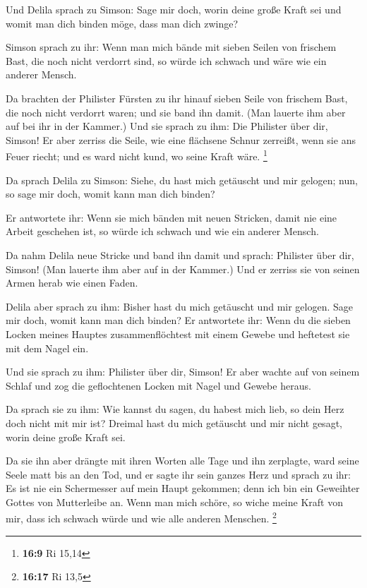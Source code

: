  Und Delila sprach zu Simson: Sage mir doch, worin deine
große Kraft sei und womit man dich binden möge, dass man dich zwinge?

 Simson sprach zu ihr: Wenn man mich bände mit sieben
Seilen von frischem Bast, die noch nicht verdorrt sind, so würde ich
schwach und wäre wie ein anderer Mensch.

 Da brachten der Philister Fürsten zu ihr hinauf sieben
Seile von frischem Bast, die noch nicht verdorrt waren; und sie band ihn
damit.  (Man lauerte ihm aber auf bei ihr in der Kammer.)
Und sie sprach zu ihm: Die Philister über dir, Simson! Er aber zerriss
die Seile, wie eine flächsene Schnur zerreißt, wenn sie ans Feuer
riecht; und es ward nicht kund, wo seine Kraft wäre. \footnote{\textbf{16:9}
  Ri 15,14}

 Da sprach Delila zu Simson: Siehe, du hast mich
getäuscht und mir gelogen; nun, so sage mir doch, womit kann man dich
binden?

 Er antwortete ihr: Wenn sie mich bänden mit neuen
Stricken, damit nie eine Arbeit geschehen ist, so würde ich schwach und
wie ein anderer Mensch.

 Da nahm Delila neue Stricke und band ihn damit und
sprach: Philister über dir, Simson! (Man lauerte ihm aber auf in der
Kammer.) Und er zerriss sie von seinen Armen herab wie einen Faden.

 Delila aber sprach zu ihm: Bisher hast du mich getäuscht
und mir gelogen. Sage mir doch, womit kann man dich binden? Er
antwortete ihr: Wenn du die sieben Locken meines Hauptes
zusammenflöchtest mit einem Gewebe und heftetest sie mit dem Nagel ein.

 Und sie sprach zu ihm: Philister über dir, Simson! Er
aber wachte auf von seinem Schlaf und zog die geflochtenen Locken mit
Nagel und Gewebe heraus.

 Da sprach sie zu ihm: Wie kannst du sagen, du habest
mich lieb, so dein Herz doch nicht mit mir ist? Dreimal hast du mich
getäuscht und mir nicht gesagt, worin deine große Kraft sei.

 Da sie ihn aber drängte mit ihren Worten alle Tage und
ihn zerplagte, ward seine Seele matt bis an den Tod,  und
er sagte ihr sein ganzes Herz und sprach zu ihr: Es ist nie ein
Schermesser auf mein Haupt gekommen; denn ich bin ein Geweihter Gottes
von Mutterleibe an. Wenn man mich schöre, so wiche meine Kraft von mir,
dass ich schwach würde und wie alle anderen Menschen. \footnote{\textbf{16:17}
  Ri 13,5}

